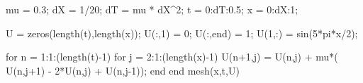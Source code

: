 mu = 0.3;
dX = 1/20;
dT = mu * dX^2;
t = 0:dT:0.5;
x = 0:dX:1;

U = zeros(length(t),length(x));
U(:,1) = 0;
U(:,end) = 1;
U(1,:) = sin(5*pi*x/2);

for n = 1:1:(length(t)-1)
    for j = 2:1:(length(x)-1)
        U(n+1,j) = U(n,j) + mu*( U(n,j+1) - 2*U(n,j) + U(n,j-1));
    end
end
mesh(x,t,U)
